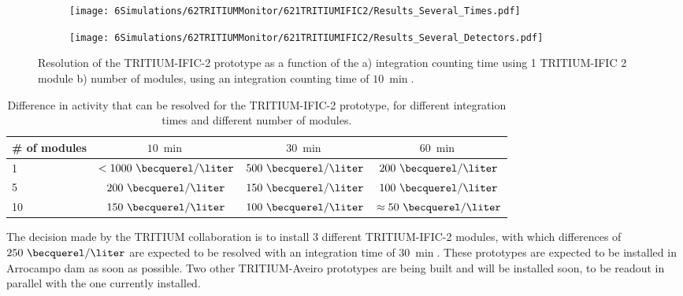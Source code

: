 \begin{figure}
\centering
    \begin{subfigure}[b]{0.75\textwidth}
    \centering
    \texttt{[image: 6Simulations/62TRITIUMMonitor/621TRITIUMIFIC2/Results\_Several\_Times.pdf]}  
    \caption{\label{subfig:ResolutionvsIntegrationCoutingTime}}
    \end{subfigure}
    \hfill
    \begin{subfigure}[b]{0.75\textwidth}
    \centering
    \texttt{[image: 6Simulations/62TRITIUMMonitor/621TRITIUMIFIC2/Results\_Several\_Detectors.pdf]}  
    \caption{\label{subfig:ResolutionvsNumberDetectors}}
    \end{subfigure}
 \caption{Resolution of the TRITIUM-IFIC-2 prototype as a function of the a) integration counting time using 1 TRITIUM-IFIC 2 module b) number of modules, using an integration counting time of $10~\min$.}
 \label{fig:Resolution}
\end{figure}

\begin{table}[htbp]
\centering{}%
\begin{tabular}{lccc}
\toprule 
\# of modules & $10~\min$ & $30~\min$ & $60~\min$ \tabularnewline
\midrule
\midrule 
1 & $<1000~\becquerel/\liter$ & $500~\becquerel/\liter$ & $200~\becquerel/\liter$ \tabularnewline
5 & $200~\becquerel/\liter$ & $150~\becquerel/\liter$ & $100~\becquerel/\liter$ \tabularnewline
10 & $150~\becquerel/\liter$ & $100~\becquerel/\liter$ & $\approx 50~\becquerel/\liter$ \tabularnewline
\bottomrule
\end{tabular}
\caption{Difference in activity that can be resolved for the TRITIUM-IFIC-2 prototype, for different integration times and different number of modules.}
\label{tab:DifferentCasesOfTI2}
\end{table}

The decision made by the TRITIUM collaboration is to install 3 different TRITIUM-IFIC-2 modules, with which differences of $250~\becquerel/\liter$ are expected to be resolved with an integration time of $30~\min$. These prototypes are expected to be installed  in Arrocampo dam as soon as possible. Two other TRITIUM-Aveiro prototypes are being built and will be installed soon, to be readout in parallel with the one currently installed.


